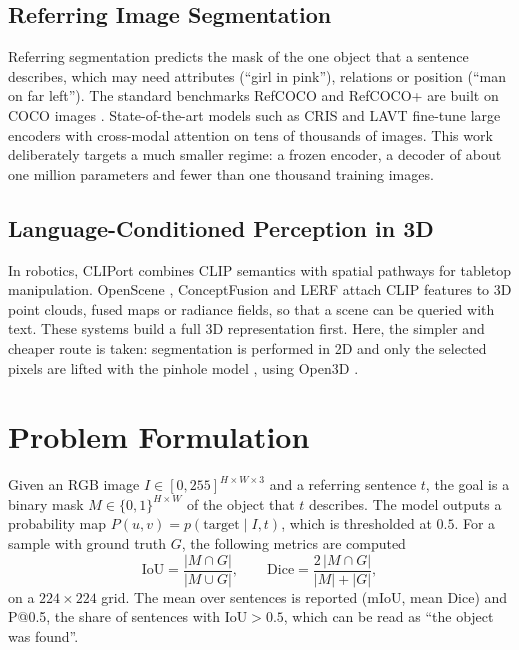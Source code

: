 \documentclass[conference,a4paper]{IEEEtran}
\begin{document}
\subsection{Referring Image Segmentation}

Referring segmentation \cite{hu2016segmentation} predicts the mask of the one object that a sentence
describes, which may need attributes (\enquote{girl in pink}), relations or position
(\enquote{man on far left}). The standard benchmarks RefCOCO and RefCOCO+ \cite{kazemzadeh2014referitgame,
yu2016refcoco} are built on COCO images \cite{lin2014coco}. State-of-the-art models such as CRIS
\cite{wang2022cris} and LAVT \cite{yang2022lavt} fine-tune large encoders with cross-modal attention
on tens of thousands of images. This work deliberately targets a much smaller regime: a frozen
encoder, a decoder of about one million parameters and fewer than one thousand training images.

\subsection{Language-Conditioned Perception in 3D}

In robotics, CLIPort \cite{shridhar2021cliport} combines CLIP semantics with spatial pathways for
tabletop manipulation. OpenScene \cite{peng2023openscene}, ConceptFusion
\cite{jatavallabhula2023conceptfusion} and LERF \cite{kerr2023lerf} attach CLIP features to 3D point
clouds, fused maps or radiance fields, so that a scene can be queried with text. These systems
build a full 3D representation first. Here, the simpler and cheaper route is taken: segmentation is
performed in 2D and only the selected pixels are lifted with the pinhole model \cite{hartley2004mvg}, using
Open3D \cite{zhou2018open3d}.

\section{Problem Formulation}
\label{sec:problem}

Given an RGB image $I \in [0,255]^{H\times W\times 3}$ and a referring sentence $t$, the goal is a
binary mask $M \in \{0,1\}^{H\times W}$ of the object that $t$ describes. The model outputs a
probability map $P(u,v) = p(\text{target} \mid I, t)$, which is thresholded at $0.5$. For a sample
with ground truth $G$, the following metrics are computed
\begin{equation}
\mathrm{IoU} = \frac{|M \cap G|}{|M \cup G|}, \qquad
\mathrm{Dice} = \frac{2\,|M \cap G|}{|M| + |G|},
\label{eq:metrics}
\end{equation}
on a $224\times 224$ grid. The mean over sentences is reported (mIoU, mean Dice) and P@0.5, the share
of sentences with $\mathrm{IoU} > 0.5$, which can be read as \enquote{the object was found}.
\end{document}
